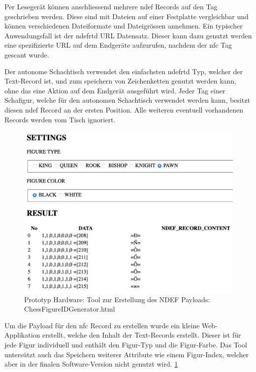 Per Lesegerät können anschliessend mehrere \gls{ndef} Records auf den
Tag geschrieben werden. Diese sind mit Dateien auf einer Festplatte
vergleichbar und können verschiedenen Dateiformate und Dateigrössen
annehmen. Ein typischer Anwendungsfall ist der \gls{ndefrtd} URL
Datensatz. Dieser kann dazu genutzt werden eine spezifizierte URL auf
dem Endgeräte aufzurufen, nachdem der \gls{nfc} Tag gescant
wurde.\cite{nordicnfclibndef}

Der autonome Schachtisch verwendet den einfachsten \gls{ndefrtd} Typ,
welcher der Text-Record ist, und zum speichern von Zeichenketten genutzt
werden kann, ohne das eine Aktion auf dem Endgerät ausgeführt wird.
Jeder Tag einer Schafigur, welche für den autonomen Schachtisch
verwendet werden kann, besitzt diesen \gls{ndef} Record an der ersten
Position. Alle weiteren eventuell vorhandenen Records werden vom Tisch
ignoriert.\cite{nordicnfclib}

\begin{figure}
\centering
\includegraphics{images/ATC_ChessFigureIDGenerator.png}
\caption{Prototyp Hardware: Tool zur Erstellung des NDEF Payloads:
ChessFigureIDGenerator.html \label{ATC_ChessFigureIDGenerator}}
\end{figure}

Um die Payload für den \gls{nfc} Record zu erstellen wurde ein kleine
Web-Applikation erstellt, welche den Inhalt der Text-Records erstellt.
Dieser ist für jede Figur individuell und enthält den Figur-Typ und die
Figur-Farbe. Das Tool untersützt auch das Speichern weiterer Attribute
wie einem Figur-Index, welcher aber in der finalen Software-Version
nicht genutzt wird. \ref{ATC_ChessFigureIDGenerator}

